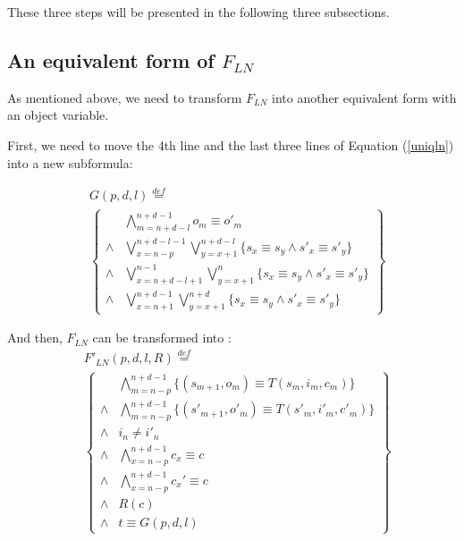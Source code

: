 \documentclass{sig-alternate}
\begin{document}
These three steps will be presented in the following three subsections.

\subsection{An equivalent form of $F_{LN}$}

As mentioned above,
we need to transform $F_{LN}$ into another equivalent form with an object variable.

First,
we need to move the 4th line and the last three lines of Equation (\ref{uniqln}) into a new subformula:

\begin{equation}\label{uniqln_subg}
\begin{split}
&G(p,d,l)\stackrel{def}{=}\\
&\left\{
\begin{array}{cc}
&\bigwedge_{m=n+d-l}^{n+d-1}o_m\equiv o'_m \\
\wedge& \bigvee_{x=n-p}^{n+d-l-1}\bigvee_{y=x+1}^{n+d-l} \{s_x\equiv s_y\wedge s'_x\equiv s'_y\} \\
\wedge& \bigvee_{x=n+d-l+1}^{n-1}\bigvee_{y=x+1}^{n} \{s_x\equiv s_y\wedge s'_x\equiv s'_y\} \\
\wedge& \bigvee_{x=n+1}^{n+d-1}\bigvee_{y=x+1}^{n+d} \{s_x\equiv s_y\wedge s'_x\equiv s'_y\}
\end{array}
\right\}
\end{split}
\end{equation}

And then,
$F_{LN}$ can be transformed into :
\begin{equation}\label{uniqln_new}
\begin{split}
&F'_{LN}(p,d,l,R)\stackrel{def}{=}\\
&\left\{
\begin{array}{cc}
&\bigwedge_{m=n-p}^{n+d-1}
\{
(s_{m+1},o_m)\equiv T(s_m,i_m,c_m)
\}
\\
\wedge&\bigwedge_{m=n-p}^{n+d-1}
\{
(s'_{m+1},o'_m)\equiv T(s'_m,i'_m,c'_m)
\}
\\
\wedge& i_n\ne i'_n \\
\wedge&\bigwedge_{x=n-p}^{n+d-1}c_x\equiv c \\
\wedge&\bigwedge_{x=n-p}^{n+d-1}c_x'\equiv c \\
\wedge& R(c) \\
\wedge& t\equiv G(p,d,l)
\end{array}
\right\}
\end{split}
\end{equation}
\end{document}
